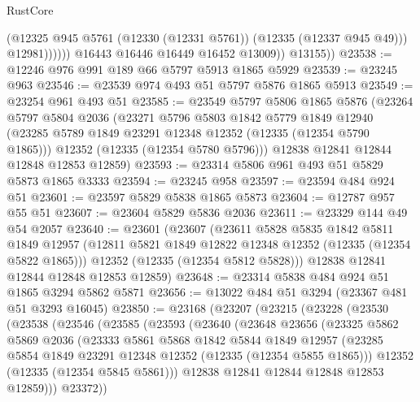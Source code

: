 \begin{lexlean}{RustCore}
\begin{coremodule}
                        (@12325 @945 @5761 (@12330 (@12331 @5761)) (@12335 (@12337 @945 @49)))
                        @12981))))))
            @16443
            @16446
            @16449
            @16452
            @13009))
        @13155))
@23538 := @12246 @976 @991 @189 @66 @5797 @5913 @1865 @5929
@23539 := @23245 @963
@23546 := @23539 @974 @493 @51 @5797 @5876 @1865 @5913
@23549 := @23254 @961 @493 @51
@23585 := @23549
    @5797
    @5806
    @1865
    @5876
    (@23264
      @5797
      @5804
      @2036
      (@23271
        @5796
        @5803
        @1842
        @5779
        @1849
        @12940
        (@23285 @5789 @1849 @23291 @12348 @12352 (@12335 (@12354 @5790 @1865)))
        @12352
        (@12335 (@12354 @5780 @5796)))
      @12838
      @12841
      @12844
      @12848
      @12853
      @12859)
@23593 := @23314 @5806 @961 @493 @51 @5829 @5873 @1865 @3333
@23594 := @23245 @958
@23597 := @23594 @484 @924 @51
@23601 := @23597 @5829 @5838 @1865 @5873
@23604 := @12787 @957 @55 @51
@23607 := @23604 @5829 @5836 @2036
@23611 := @23329 @144 @49 @54 @2057
@23640 := @23601
    (@23607
      (@23611
        @5828
        @5835
        @1842
        @5811
        @1849
        @12957
        (@12811 @5821 @1849 @12822 @12348 @12352 (@12335 (@12354 @5822 @1865)))
        @12352
        (@12335 (@12354 @5812 @5828)))
      @12838
      @12841
      @12844
      @12848
      @12853
      @12859)
@23648 := @23314 @5838 @484 @924 @51 @1865 @3294 @5862 @5871
@23656 := @13022 @484 @51 @3294 (@23367 @481 @51 @3293 @16045)
@23850 := @23168
    (@23207
      (@23215
        (@23228
          (@23530
            (@23538
              (@23546
                (@23585
                  (@23593
                    (@23640
                      (@23648
                        @23656
                        (@23325
                          @5862
                          @5869
                          @2036
                          (@23333
                            @5861
                            @5868
                            @1842
                            @5844
                            @1849
                            @12957
                            (@23285 @5854 @1849 @23291 @12348 @12352 (@12335 (@12354 @5855 @1865)))
                            @12352
                            (@12335 (@12354 @5845 @5861)))
                          @12838
                          @12841
                          @12844
                          @12848
                          @12853
                          @12859)))
                    @23372))

\end{coremodule}
\end{lexlean}
